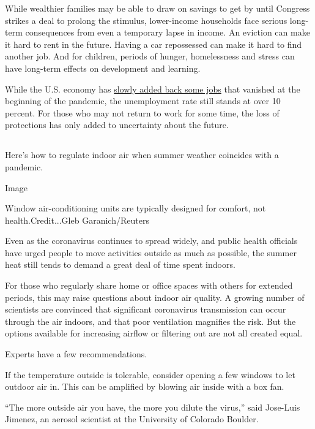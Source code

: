 While wealthier families may be able to draw on savings to get by until
Congress strikes a deal to prolong the stimulus, lower-income households
face serious long-term consequences from even a temporary lapse in
income. An eviction can make it hard to rent in the future. Having a car
repossessed can make it hard to find another job. And for children,
periods of hunger, homelessness and stress can have long-term effects on
development and learning.

While the U.S. economy has
\href{https://www.nytimes.com/live/2020/08/07/business/stock-market-today-coronavirus}{slowly
added back some jobs} that vanished at the beginning of the pandemic,
the unemployment rate still stands at over 10 percent. For those who may
not return to work for some time, the loss of protections has only added
to uncertainty about the future.

\hypertarget{section-9}{%
\subsection{}\label{section-9}}

Here's how to regulate indoor air when summer weather coincides with a
pandemic.

Image

Window air-conditioning units are typically designed for comfort, not
health.Credit...Gleb Garanich/Reuters

Even as the coronavirus continues to spread widely, and public health
officials have urged people to move activities outside as much as
possible, the summer heat still tends to demand a great deal of time
spent indoors.

For those who regularly share home or office spaces with others for
extended periods, this may raise questions about indoor air quality. A
growing number of scientists are convinced that significant coronavirus
transmission can occur through the air indoors, and that poor
ventilation magnifies the risk. But the options available for increasing
airflow or filtering out are not all created equal.

Experts have a few recommendations.

If the temperature outside is tolerable, consider opening a few windows
to let outdoor air in. This can be amplified by blowing air inside with
a box fan.

``The more outside air you have, the more you dilute the virus,'' said
Jose-Luis Jimenez, an aerosol scientist at the University of Colorado
Boulder.

